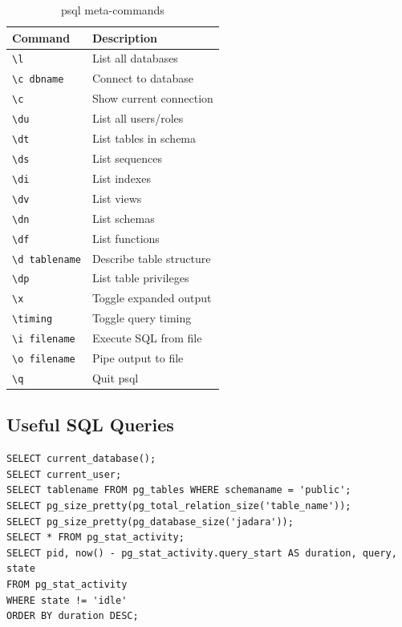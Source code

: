 \documentclass[11pt,a4paper]{article}
\begin{document}
\begin{table}[h]
\centering
\begin{tabular}{@{}ll@{}}
\toprule
\textbf{Command} & \textbf{Description} \\
\midrule
\texttt{\textbackslash l} & List all databases \\
\texttt{\textbackslash c dbname} & Connect to database \\
\texttt{\textbackslash c} & Show current connection \\
\texttt{\textbackslash du} & List all users/roles \\
\texttt{\textbackslash dt} & List tables in schema \\
\texttt{\textbackslash ds} & List sequences \\
\texttt{\textbackslash di} & List indexes \\
\texttt{\textbackslash dv} & List views \\
\texttt{\textbackslash dn} & List schemas \\
\texttt{\textbackslash df} & List functions \\
\texttt{\textbackslash d tablename} & Describe table structure \\
\texttt{\textbackslash dp} & List table privileges \\
\texttt{\textbackslash x} & Toggle expanded output \\
\texttt{\textbackslash timing} & Toggle query timing \\
\texttt{\textbackslash i filename} & Execute SQL from file \\
\texttt{\textbackslash o filename} & Pipe output to file \\
\texttt{\textbackslash q} & Quit psql \\
\bottomrule
\end{tabular}
\caption{psql meta-commands}
\end{table}

\subsection{Useful SQL Queries}

\begin{lstlisting}[style=sql]
SELECT current_database();
SELECT current_user;
SELECT tablename FROM pg_tables WHERE schemaname = 'public';
SELECT pg_size_pretty(pg_total_relation_size('table_name'));
SELECT pg_size_pretty(pg_database_size('jadara'));
SELECT * FROM pg_stat_activity;
SELECT pid, now() - pg_stat_activity.query_start AS duration, query, state
FROM pg_stat_activity
WHERE state != 'idle'
ORDER BY duration DESC;
\end{lstlisting}
\end{document}
